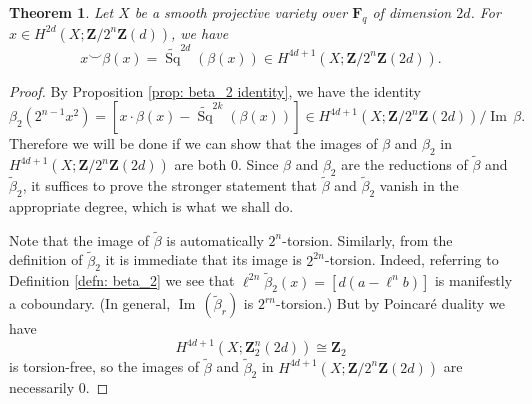 \documentclass[10pt, reqno]{amsart}
\numberwithin{equation}{subsection}
\newcommand{\F}{\mathbf{F}}
\newcommand{\wt}[1]{\widetilde{#1}}
\newcommand{\Z}{\mathbf{Z}}
\DeclareMathOperator{\et}{\acute{e}t}
\DeclareMathOperator{\Ima}{Im\,}
\DeclareMathOperator{\Sq}{Sq}
\newtheorem{thm}{Theorem}[section]
\theoremstyle{remark}
\begin{document}
 
 


\begin{thm}\label{thm: pairing identity}
Let $X $ be a smooth projective variety over $\F_q$ of dimension $2d$. For $x \in H^{2d}_{\et}(X;\Z/2^n \Z(d))$, we have 
\[
x \smile \beta (x) = \wt{\Sq}^{2d} (\beta( x)) \in H^{4d+1}_{\et}(X;\Z/2^n \Z(2d)).
\]
\end{thm}

\begin{proof}
By Proposition \ref{prop: beta_2 identity}, we have the identity 
\[
\beta_2(2^{n-1} x^2)= [x \cdot \beta (x) - \wt{\Sq}^{2k} (\beta (x)) ] \in H^{4d+1}_{\et}(X;\Z/2^n\Z(2d))/\Ima \beta.
\]
Therefore we will be done if we can show that the images of $\beta$ and $ \beta_2$ in $H^{4d+1}_{\et}(X;\Z/2^n \Z(2d))$ are both $0$. Since $\beta$ and $\beta_2$ are the reductions of $\wt{\beta}$ and $\wt{\beta}_2$, it suffices to prove the stronger statement that $\wt{\beta}$ and $\wt{\beta}_2$ vanish in the appropriate degree, which is what we shall do. 

Note that the image of $\wt{\beta}$ is automatically $2^n$-torsion. Similarly, from the definition of $\wt{\beta}_2$ it is immediate that its image is $2^{2n}$-torsion. Indeed, referring to Definition \ref{defn: beta_2} we see that $\ell^{2n} \wt{\beta}_2(x) = [d (a -\ell^n b) ] $ is manifestly a coboundary. (In general, $\Ima(\wt{\beta}_r)$ is $2^{rn}$-torsion.) But by Poincar\'{e} duality we have
\[
H^{4d+1}_{\et}(X;\Z_2^n(2d)) \cong \Z_2
\]
is torsion-free, so the images of $\wt{\beta}$ and $\wt{\beta}_2$ in $H^{4d+1}_{\et}(X;\Z/2^n\Z(2d))$ are necessarily $0$. 
\end{proof}
\end{document}
